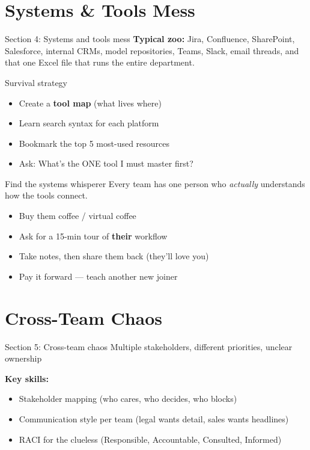 \documentclass[aspectratio=169, 11pt]{beamer}
\begin{document}
	\section{Systems \& Tools Mess}
	\begin{frame}{Section 4: Systems and tools mess}
		\textbf{Typical zoo:} Jira, Confluence, SharePoint, Salesforce, internal CRMs, model repositories, Teams, Slack, email threads, and that one Excel file that runs the entire department.
		\vspace{0.3cm}
		\begin{block}{Survival strategy}
			\begin{itemize}
				\item Create a \textbf{tool map} (what lives where)
				\item Learn search syntax for each platform
				\item Bookmark the top 5 most-used resources
				\item Ask:   What's the ONE tool I must master first? 
			\end{itemize}
		\end{block}
	\end{frame}
	
	\begin{frame}{Find the systems whisperer}
		Every team has one person who \textit{actually} understands how the tools connect.
		\vspace{0.3cm}
		\begin{itemize}
			\item Buy them coffee / virtual coffee
			\item Ask for a 15-min tour of \textbf{their} workflow
			\item Take notes, then share them back (they'll love you)
			\item Pay it forward — teach another new joiner
		\end{itemize}
	\end{frame}
	
	\section{Cross-Team Chaos}
	\begin{frame}{Section 5: Cross-team chaos}
		\centering
		\Large{Multiple stakeholders, different priorities, unclear ownership}
		\vspace{0.4cm}
		
		\textbf{Key skills:}
		\begin{itemize}
			\item Stakeholder mapping (who cares, who decides, who blocks)
			\item Communication style per team (legal wants detail, sales wants headlines)
			\item RACI for the clueless (Responsible, Accountable, Consulted, Informed)
		\end{itemize}
	\end{frame}
	
\end{document}
